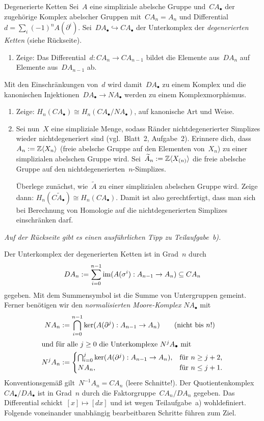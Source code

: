 \documentclass{uebblatt}
\begin{document}
\begin{aufgabe}{Degenerierte Ketten}
Sei~$A$ eine simpliziale abelsche Gruppe und~$CA_\bullet$ der zugehörige
Komplex abelscher Gruppen mit~$CA_n = A_n$ und Differential~$d = \sum_i (-1)^n
A(\partial^i)$. Sei~$DA_\bullet \hookrightarrow CA_\bullet$ der Unterkomplex
der \emph{degenerierten Ketten} (siehe Rückseite).
\begin{enumerate}
\item Zeige: Das Differential~$d : CA_n \to CA_{n-1}$ bildet die Elemente
aus~$DA_n$ auf Elemente aus~$DA_{n-1}$ ab.
\end{enumerate}
Mit den Einschränkungen von~$d$ wird damit~$DA_\bullet$ zu einem Komplex und die
kanonischen Injektionen~$DA_\bullet \to NA_\bullet$ werden zu einem Komplexmorphismus.
\begin{enumerate}
\addtocounter{enumi}{1}
\item Zeige: $H_n(CA_\bullet) \cong H_n(CA_\bullet/NA_\bullet)$, auf kanonische
Art und Weise.
\item Sei nun~$X$ eine simpliziale Menge, sodass Ränder nichtdegenerierter
Simplizes wieder nichtdegeneriert sind (vgl.~Blatt~2, Aufgabe~2). Erinnere
dich, dass~$A_n := \mathbb{Z}\langle X_n \rangle$ (freie abelsche Gruppe auf den
Elementen von~$X_n$) zu einer simplizialen abelschen Gruppe wird.
Sei~$\widetilde A_n := \mathbb{Z}\langle X_{(n)} \rangle$ die freie abelsche Gruppe
auf den nichtdegenerierten~$n$-Simplizes.

Überlege zunächst, wie~$\widetilde A$ zu einer simplizialen abelschen Gruppe wird.
Zeige dann: $H_n(C\widetilde A_\bullet) \cong H_n(CA_\bullet)$. Damit ist also
gerechtfertigt, dass man sich bei Berechnung von Homologie auf die
nichtdegenerierten Simplizes einschränken darf.
\end{enumerate}

\emph{Auf der Rückseite gibt es einen ausführlichen Tipp zu Teilaufgabe~b).}
\end{aufgabe}

Der Unterkomplex der degenerierten Ketten ist in Grad~$n$ durch
\[ DA_n := \sum_{i=0}^{n-1} \operatorname{im}(A(\sigma^i) : A_{n-1} \to A_n) \subseteq
CA_n \]
gegeben. Mit dem Summensymbol ist die Summe von Untergruppen gemeint. Ferner
benötigen wir den \emph{normalisierten Moore-Komplex} $NA_\bullet$ mit
\begin{align*}
  NA_n &:= \bigcap_{i=0}^{n-1} \operatorname{ker}(A(\partial^j) : A_{n-1} \to A_n)
\qquad\text{(nicht bis~$n$!)} \\
\intertext{und für alle~$j \geq 0$ die Unterkomplexe~$N^jA_\bullet$ mit}
  N^jA_n &:= \begin{cases}
  \bigcap_{i=0}^j \operatorname{ker}(A(\partial^j) : A_{n-1} \to A_n), &
  \text{für~$n \geq j + 2$,} \\
  NA_n, &
  \text{für~$n \leq j + 1$.} \end{cases}
\end{align*}
Konventionsgemäß gilt~$N^{-1}A_n = CA_n$ (leere Schnitte!).
Der Quotientenkomplex~$CA_\bullet/DA_\bullet$ ist in Grad~$n$ durch die
Faktorgruppe~$CA_n/DA_n$ gegeben. Das Differential schickt~$[x] \mapsto [dx]$
und ist wegen Teilaufgabe~a) wohldefiniert. Folgende voneinander unabhängig
bearbeitbaren Schritte führen zum Ziel.
\end{document}
